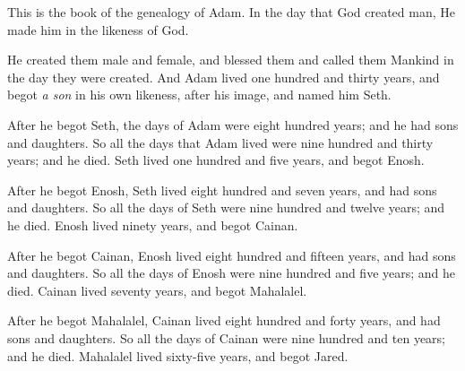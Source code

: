 

\bverse This is the book of the genealogy of Adam. In the day that God created man, He made him in the likeness of God.

\bverse He created them male and female, and blessed them and called them Mankind in the day they were created.
\bverse And Adam lived one hundred and thirty years, and begot \textit{a son} in his own likeness, after his image, and named him Seth.

\bverse After he begot Seth, the days of Adam were eight hundred years; and he had sons and daughters.
\bverse So all the days that Adam lived were nine hundred and thirty years; and he died.
\bverse Seth lived one hundred and five years, and begot Enosh.
	
\bverse After he begot Enosh, Seth lived eight hundred and seven years, and had sons and daughters.	
\bverse So all the days of Seth were nine hundred and twelve years; and he died.
\bverse Enosh lived ninety years, and begot Cainan.
	
\bverse After he begot Cainan, Enosh lived eight hundred and fifteen years, and had sons and daughters.	
\bverse So all the days of Enosh were nine hundred and five years; and he died.
\bverse Cainan lived seventy years, and begot Mahalalel.
	
\bverse After he begot Mahalalel, Cainan lived eight hundred and forty years, and had sons and daughters.	
\bverse So all the days of Cainan were nine hundred and ten years; and he died.
\bverse Mahalalel lived sixty-five years, and begot Jared. 
	
